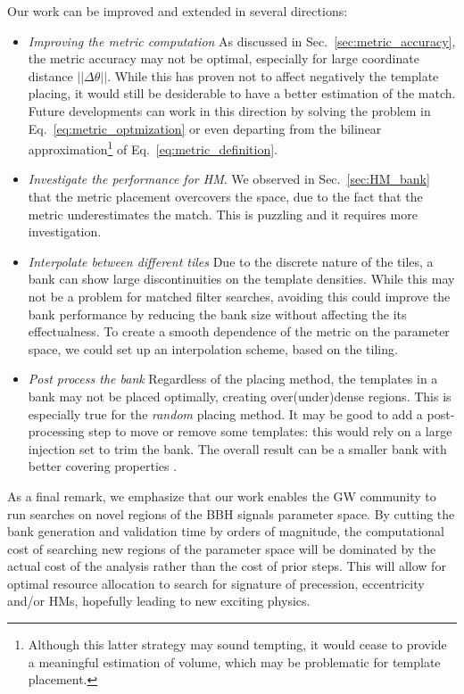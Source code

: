\documentclass[twocolumn,showpacs,preprintnumbers,nofootinbib,prd,
superscriptaddress,10pt]{revtex4-2}
\begin{document}
Our work can be improved and extended in several directions:
\begin{itemize}
	\item {\it Improving the metric computation} As discussed in Sec.~\ref{sec:metric_accuracy}, the metric accuracy may not be optimal, especially for large coordinate distance $||\Delta\theta||$. While this has proven not to affect negatively the template placing, it would still be desiderable to have a better estimation of the match. Future developments can work in this direction by solving the problem in Eq.~\eqref{eq:metric_optmization} or even departing from the bilinear approximation\footnote{
Although this latter strategy may sound tempting, it would cease to provide a meaningful estimation of volume, which may be problematic for template placement.} of Eq.~\eqref{eq:metric_definition}.
	
	\item {\it Investigate the performance for HM}. We observed in Sec.~\ref{sec:HM_bank} that the metric placement overcovers the space, due to the fact that the metric underestimates the match. This is puzzling and it requires more investigation.
	
	\item {\it Interpolate between different tiles} Due to the discrete nature of the tiles, a bank can show large discontinuities on the template densities. While this may not be a problem for matched filter searches, avoiding this could improve the bank performance by reducing the bank size without affecting the its effectualness. To create a smooth dependence of the metric on the parameter space, we could set up an interpolation scheme, based on the tiling.
	
	\item {\it Post process the bank} Regardless of the placing method, the templates in a bank may not be placed optimally, creating over(under)dense regions. This is especially true for the {\it random} placing method. It may be good to add a post-processing step to move or remove some templates: this would rely on a large injection set to trim the bank. The overall result can be a smaller bank with better covering properties \cite{Indik:2017vqq}.
\end{itemize}

As a final remark, we emphasize that our work enables the GW community to run searches on novel regions of the BBH signals parameter space. By cutting the bank generation and validation time by orders of magnitude, the computational cost of searching new regions of the parameter space will be dominated by the actual cost of the analysis rather than the cost of prior steps.
This will allow for optimal resource allocation to search for signature of precession, eccentricity and/or HMs, hopefully leading to new exciting physics.
\end{document}
